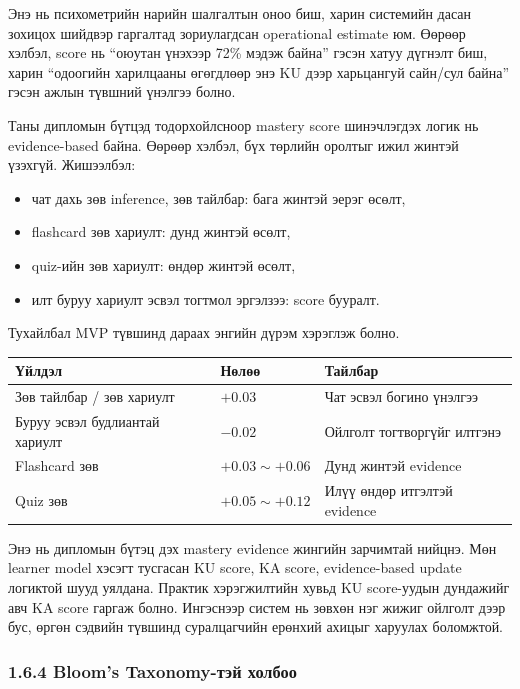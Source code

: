 \documentclass[12pt,A4]{report}
\begin{document}
Энэ нь психометрийн нарийн шалгалтын оноо биш, харин системийн дасан зохицох шийдвэр гаргалтад зориулагдсан operational estimate юм. Өөрөөр хэлбэл, score нь ``оюутан үнэхээр 72\% мэдэж байна'' гэсэн хатуу дүгнэлт биш, харин ``одоогийн харилцааны өгөгдлөөр энэ KU дээр харьцангуй сайн/сул байна'' гэсэн ажлын түвшний үнэлгээ болно.

Таны дипломын бүтцэд тодорхойлсноор mastery score шинэчлэгдэх логик нь evidence-based байна. Өөрөөр хэлбэл, бүх төрлийн оролтыг ижил жинтэй үзэхгүй. Жишээлбэл:

\begin{itemize}
    \item чат дахь зөв inference, зөв тайлбар: бага жинтэй эерэг өсөлт,
    \item flashcard зөв хариулт: дунд жинтэй өсөлт,
    \item quiz-ийн зөв хариулт: өндөр жинтэй өсөлт,
    \item илт буруу хариулт эсвэл тогтмол эргэлзээ: score бууралт.
\end{itemize}

Тухайлбал MVP түвшинд дараах энгийн дүрэм хэрэглэж болно.

\begin{center}
\begin{tabular}{lll}
\toprule
\textbf{Үйлдэл} & \textbf{Нөлөө} & \textbf{Тайлбар} \\
\midrule
Зөв тайлбар / зөв хариулт & $+0.03$ & Чат эсвэл богино үнэлгээ \\
Буруу эсвэл будлиантай хариулт & $-0.02$ & Ойлголт тогтворгүйг илтгэнэ \\
Flashcard зөв & $+0.03 \sim +0.06$ & Дунд жинтэй evidence \\
Quiz зөв & $+0.05 \sim +0.12$ & Илүү өндөр итгэлтэй evidence \\
\bottomrule
\end{tabular}
\end{center}

Энэ нь дипломын бүтэц дэх mastery evidence жингийн зарчимтай нийцнэ. Мөн learner model хэсэгт тусгасан KU score, KA score, evidence-based update логиктой шууд уялдана. Практик хэрэгжилтийн хувьд KU score-уудын дундажийг авч KA score гаргаж болно. Ингэснээр систем нь зөвхөн нэг жижиг ойлголт дээр бус, өргөн сэдвийн түвшинд суралцагчийн ерөнхий ахицыг харуулах боломжтой.

\subsubsection{1.6.4 Bloom's Taxonomy-тэй холбоо}
\end{document}
